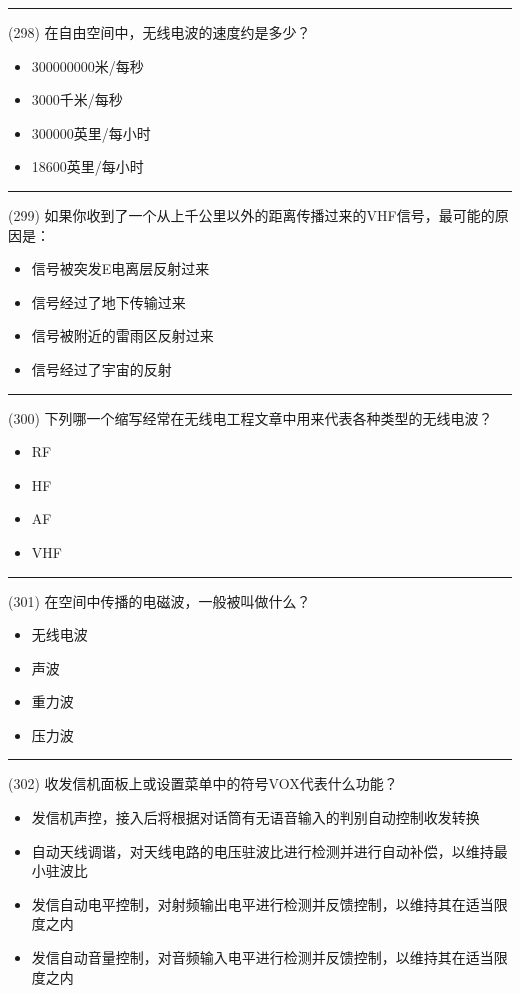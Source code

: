 \documentclass[twocolumn]{ctexart}  %
\begin{document}
\noindent\rule{0.5\textwidth}{1pt}
\heiti (298) 在自由空间中，无线电波的速度约是多少？ \songti {\color{gray} [LK1115] }
\begin{itemize}
	\item  300000000米/每秒
	\item  3000千米/每秒
	\item  300000英里/每小时
	\item  18600英里/每小时
\end{itemize}


\noindent\rule{0.5\textwidth}{1pt}
\heiti (299) 如果你收到了一个从上千公里以外的距离传播过来的VHF信号，最可能的原因是： \songti {\color{gray} [LK1116] }
\begin{itemize}
	\item  信号被突发E电离层反射过来
	\item  信号经过了地下传输过来
	\item  信号被附近的雷雨区反射过来
	\item  信号经过了宇宙的反射
\end{itemize}


\noindent\rule{0.5\textwidth}{1pt}
\heiti (300) 下列哪一个缩写经常在无线电工程文章中用来代表各种类型的无线电波？ \songti {\color{gray} [LK1143] }
\begin{itemize}
	\item  RF
	\item  HF
	\item  AF
	\item  VHF
\end{itemize}


\noindent\rule{0.5\textwidth}{1pt}
\heiti (301) 在空间中传播的电磁波，一般被叫做什么？ \songti {\color{gray} [LK1144] }
\begin{itemize}
	\item  无线电波
	\item  声波
	\item  重力波
	\item  压力波
\end{itemize}


\noindent\rule{0.5\textwidth}{1pt}
\heiti (302) 收发信机面板上或设置菜单中的符号VOX代表什么功能？ \songti {\color{gray} [LK0255] }
\begin{itemize}
	\item  发信机声控，接入后将根据对话筒有无语音输入的判别自动控制收发转换
	\item  自动天线调谐，对天线电路的电压驻波比进行检测并进行自动补偿，以维持最小驻波比
	\item  发信自动电平控制，对射频输出电平进行检测并反馈控制，以维持其在适当限度之内
	\item  发信自动音量控制，对音频输入电平进行检测并反馈控制，以维持其在适当限度之内
\end{itemize}
\end{document}
